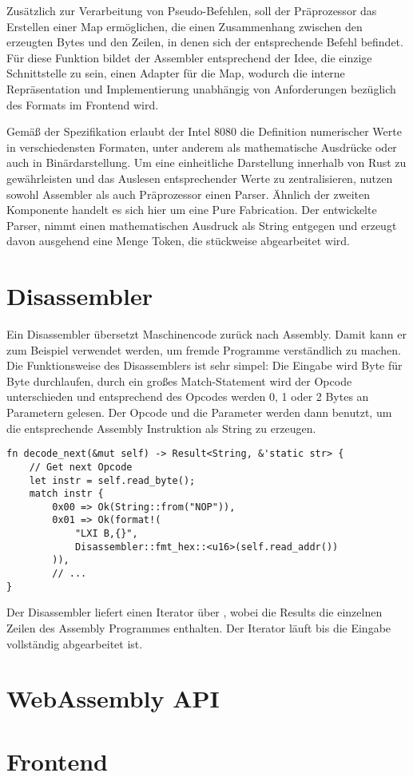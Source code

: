 Zusätzlich zur Verarbeitung von Pseudo-Befehlen, soll der Präprozessor das Erstellen einer Map ermöglichen, die einen Zusammenhang zwischen den erzeugten Bytes und den Zeilen, in denen sich der entsprechende Befehl befindet. Für diese Funktion bildet der Assembler entsprechend der Idee, die einzige Schnittstelle zu sein, einen Adapter für die Map, wodurch die interne Repräsentation und Implementierung unabhängig von Anforderungen bezüglich des Formats im Frontend wird.

Gemäß der Spezifikation erlaubt der Intel 8080 die Definition numerischer Werte in verschiedensten Formaten, unter anderem als mathematische Ausdrücke oder auch in Binärdarstellung. Um eine einheitliche Darstellung innerhalb von Rust zu gewährleisten und das Auslesen entsprechender Werte zu zentralisieren, nutzen sowohl Assembler als auch Präprozessor einen Parser. Ähnlich der zweiten Komponente handelt es sich hier um eine Pure Fabrication. Der entwickelte Parser, nimmt einen mathematischen Ausdruck als String entgegen und erzeugt davon ausgehend eine Menge Token, die stückweise abgearbeitet wird.

\section{Disassembler}

Ein Disassembler übersetzt Maschinencode zurück nach Assembly. Damit kann er zum Beispiel verwendet werden, um fremde Programme verständlich zu machen.
Die Funktionsweise des Disassemblers ist sehr simpel: Die Eingabe wird Byte für Byte durchlaufen, durch ein großes Match-Statement wird der Opcode unterschieden und entsprechend des Opcodes werden 0, 1 oder 2 Bytes an Parametern gelesen. Der Opcode und die Parameter werden dann benutzt, um die entsprechende Assembly Instruktion als String zu erzeugen.

\begin{verbatim}
fn decode_next(&mut self) -> Result<String, &'static str> {
    // Get next Opcode
    let instr = self.read_byte();
    match instr {
        0x00 => Ok(String::from("NOP")),
        0x01 => Ok(format!(
            "LXI B,{}",
            Disassembler::fmt_hex::<u16>(self.read_addr())
        )),
        // ...
}
\end{verbatim}

Der Disassembler liefert einen Iterator über , wobei die Results die einzelnen Zeilen des Assembly Programmes enthalten. Der Iterator läuft bis die Eingabe vollständig abgearbeitet ist.

\section{WebAssembly API}

\section{Frontend}
